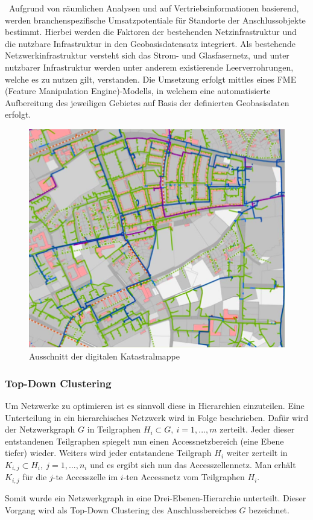 \ Aufgrund von räumlichen Analysen und auf Vertriebsinformationen basierend, werden branchenspezifische Umsatzpotentiale für Standorte der
Anschlussobjekte bestimmt. Hierbei werden die Faktoren der bestehenden Netzinfrastruktur und die nutzbare Infrastruktur in den 
Geobasisdatensatz integriert. Als bestehende Netzwerkinfrastruktur versteht sich das Strom- und Glasfasernetz, und unter nutzbarer Infrastruktur
werden unter anderem existierende Leerverrohrungen, welche es zu nutzen gilt, verstanden. Die Umsetzung erfolgt mittles eines FME (Feature Manipulation
Engine)-Modells, in welchem eine automatisierte Aufbereitung des jeweiligen Gebietes auf Basis der definierten Geobasisdaten erfolgt\cite{prossegger1}.

\begin{figure}[H]
    \centerline{\includegraphics[scale=0.5]{pics/dkm.png}}
    \caption[Digitale Katastralmappe]{\label{FiG:Digitale Katastralmappe }
	Ausschnitt der digitalen Katastralmappe\cite{prossegger1}}
\end{figure}



\subsubsection{Top-Down Clustering}
\label{sec:2methoden}


\vspace{0.5cm}

Um Netzwerke zu optimieren ist es sinnvoll diese in Hierarchien einzuteilen. Eine Unterteilung in ein hierarchisches Netzwerk wird in Folge beschrieben. 
Dafür wird der Netzwerkgraph $G$ in Teilgraphen $H_{i}\subset G,
~i=1,...,m$ zerteilt. Jeder dieser entstandenen Teilgraphen spiegelt nun einen Accessnetzbereich (eine Ebene tiefer) wieder. Weiters wird jeder entstandene
Teilgraph $H_{i}$ weiter zerteilt in $K_{i,j}\subset H_{i}, ~j=1,...,n_{i}$ und es ergibt sich nun das Accesszellennetz. Man erhält $K_{i,j}$ für die
$j$-te Accesszelle im $i$-ten Accessnetz vom Teilgraphen $H_{i}$. 
\par Somit wurde ein Netzwerkgraph in eine Drei-Ebenen-Hierarchie unterteilt.
Dieser Vorgang wird als Top-Down Clustering des Anschlussbereiches $G$ bezeichnet.
\vspace{0.5cm}

